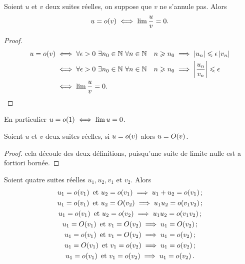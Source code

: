 \begin{prop}
  Soient \(u\) et \(v\) deux suites réelles, on suppose que \(v\) ne s'annule pas. Alors
  \begin{equation}
    u=o\mathopen{}\left(v\right) \iff \lim \frac{u}{v}=0.
  \end{equation}
\end{prop}
\begin{proof}
  \begin{align}
    u=o\mathopen{}\left(v\right) & \iff \forall \epsilon > 0 \ \exists n_0 \in \mathbb{N} \ \forall n \in \mathbb{N} \quad n \geqslant n_0 \implies \left\lvert u_n\right\rvert \leqslant \epsilon \left\lvert v_n\right\rvert \\
    & \iff \forall \epsilon > 0 \ \exists n_0 \in \mathbb{N} \ \forall n \in \mathbb{N} \quad n \geqslant n_0 \implies \left\lvert\frac{u_n}{v_n}\right\rvert \leqslant \epsilon \\
    & \iff \lim \frac{u}{v} =0.
  \end{align}
\end{proof}
En particulier \(u=o\mathopen{}\left(1\right) \iff \lim u =0\).
\begin{prop}
  Soient \(u\) et \(v\) deux suites réelles, si \(u=o\mathopen{}\left(v\right)\) alors \(u=O\mathopen{}\left(v\right)\).
\end{prop}
\begin{proof}
  cela découle des deux définitions, puisqu'une suite de limite nulle est a fortiori bornée.
\end{proof}
\begin{prop}
  Soient quatre suites réelles \(u_1, u_2, v_1\) et \(v_2\). Alors
  \begin{gather}
    u_1=o\mathopen{}\left(v_1\right)\text{~et~}u_2=o\mathopen{}\left(v_1\right)\implies u_1+u_2=o\mathopen{}\left(v_1\right);\\
    u_1=o\mathopen{}\left(v_1\right)\text{~et~}u_2=O\mathopen{}\left(v_2\right)\implies u_1u_2=o\mathopen{}\left(v_1 v_2\right);\\
    u_1=o\mathopen{}\left(v_1\right)\text{~et~}u_2=o\mathopen{}\left(v_2\right)\implies u_1u_2=o\mathopen{}\left(v_1 v_2\right);\\
    u_1=O\mathopen{}\left(v_1\right)\text{~et~}v_1=O\mathopen{}\left(v_2\right)\implies u_1=O\mathopen{}\left(v_2\right);\\
    u_1=o\mathopen{}\left(v_1\right)\text{~et~}v_1=O\mathopen{}\left(v_2\right)\implies u_1=o\mathopen{}\left(v_2\right);\\
    u_1=O\mathopen{}\left(v_1\right)\text{~et~}v_1=o\mathopen{}\left(v_2\right)\implies u_1=o\mathopen{}\left(v_2\right);\\
    u_1=o\mathopen{}\left(v_1\right)\text{~et~}v_1=o\mathopen{}\left(v_2\right)\implies u_1=o\mathopen{}\left(v_2\right).
  \end{gather}
\end{prop}
